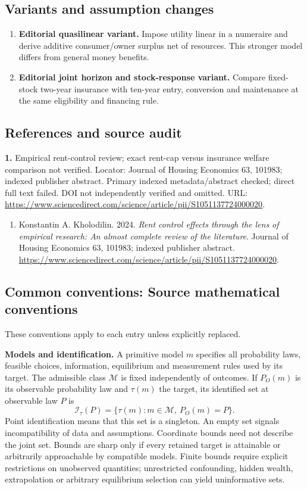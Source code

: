 \documentclass[11pt,a4paper]{article}
\begin{document}
\subsection*{Variants and assumption changes}
\begin{enumerate}
\item \textbf{Editorial quasilinear variant.} Impose utility linear in a numeraire and derive additive consumer/owner surplus net of resources. This stronger model differs from general money benefits.
\item \textbf{Editorial joint horizon and stock-response variant.} Compare fixed-stock two-year insurance with ten-year entry, conversion and maintenance at the same eligibility and financing rule.
\end{enumerate}
\subsection*{References and source audit}
\textbf{1.} Empirical rent-control review; exact rent-cap versus insurance welfare comparison not verified. Locator: Journal of Housing Economics 63, 101983; indexed publisher abstract. Primary indexed metadata/abstract checked; direct full text failed. DOI not independently verified and omitted. URL: \url{https://www.sciencedirect.com/science/article/pii/S1051137724000020}.
\begin{enumerate}\raggedright
\item\hypertarget{definitions:source:30007745:1}{} Konstantin A. Kholodilin. 2024. \emph{Rent control effects through the lens of empirical research: An almost complete review of the literature}. Journal of Housing Economics 63, 101983; indexed publisher abstract.
\url{https://www.sciencedirect.com/science/article/pii/S1051137724000020}.
\end{enumerate}

\subsection*{Common conventions: Source mathematical conventions}

These conventions apply to each entry unless explicitly replaced.

\textbf{Models and identification.} A primitive model \(m\) specifies all probability laws, feasible choices, information, equilibrium and measurement rules used by its target. The admissible class \(\mathcal M\) is fixed independently of outcomes. If \(P_O(m)\) is its observable probability law and \(\tau(m)\) the target, its identified set at observable law \(P\) is
\[
 \mathcal I_\tau(P)=\{\tau(m):m\in\mathcal M,\ P_O(m)=P\}.
\]
Point identification means that this set is a singleton. An empty set signals incompatibility of data and assumptions. Coordinate bounds need not describe the joint set. Bounds are sharp only if every retained target is attainable or arbitrarily approachable by compatible models. Finite bounds require explicit restrictions on unobserved quantities; unrestricted confounding, hidden wealth, extrapolation or arbitrary equilibrium selection can yield uninformative sets.
\end{document}
